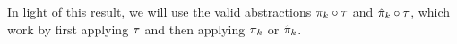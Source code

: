 \noindent 
In light of this result, we will use the valid abstractions $\pi_k\circ\tau$ and $\hat{\pi}_k\circ\tau$,
which work by first applying $\tau$ and then applying $\pi_k$ or $\hat{\pi}_k$.

%
%
%
%
%
%
%
%
%
%
